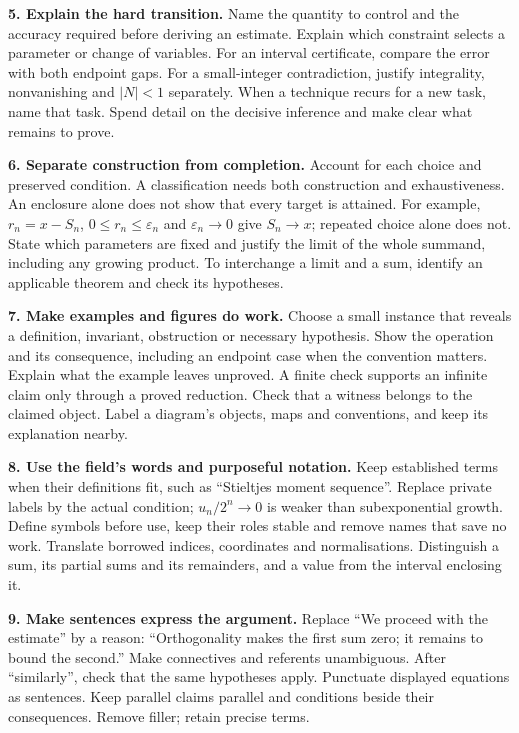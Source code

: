 \documentclass[10pt]{article}
\newcommand{\instruction}[2]{\par\medskip\noindent\textbf{#1.} #2\par}
\begin{document}
\instruction{5. Explain the hard transition}{
Name the quantity to control and the accuracy required before deriving an estimate.
Explain which constraint selects a parameter or change of variables. For an
interval certificate, compare the error with both endpoint gaps. For a
small-integer contradiction, justify integrality, nonvanishing and $|N|<1$
separately. When a technique recurs for a new task, name that task. Spend detail
on the decisive inference and make clear what remains to prove.}

\instruction{6. Separate construction from completion}{
Account for each choice and preserved condition. A classification needs both
construction and exhaustiveness. An enclosure alone does not show that every
target is attained. For example, $r_n=x-S_n$, $0\le r_n\le\varepsilon_n$
and $\varepsilon_n\to0$ give $S_n\to x$; repeated choice alone does not.
State which parameters are fixed and justify the limit of the whole summand,
including any growing product. To interchange a limit and a sum, identify an
applicable theorem and check its hypotheses.}

\newpage\enlargethispage{3\baselineskip}
\instruction{7. Make examples and figures do work}{
Choose a small instance that reveals a definition, invariant, obstruction or
necessary hypothesis. Show the operation and its consequence, including an
endpoint case when the convention matters. Explain what the example leaves
unproved. A finite check supports an infinite claim only through a proved
reduction. Check that a witness belongs to the claimed object. Label a diagram's
objects, maps and conventions, and keep its explanation nearby.}

\instruction{8. Use the field's words and purposeful notation}{
Keep established terms when their definitions fit, such as ``Stieltjes moment
sequence''. Replace private labels by the actual condition; $u_n/2^n\to0$
is weaker than subexponential growth. Define symbols before use, keep their
roles stable and remove names that save no work. Translate borrowed indices,
coordinates and normalisations. Distinguish a sum, its partial sums and its
remainders, and a value from the interval enclosing it.}

\instruction{9. Make sentences express the argument}{
Replace ``We proceed with the estimate'' by a reason: ``Orthogonality makes the
first sum zero; it remains to bound the second.'' Make connectives and referents
unambiguous. After ``similarly'', check that the same hypotheses apply.
Punctuate displayed equations as sentences. Keep parallel claims parallel
and conditions beside their consequences. Remove filler; retain precise terms.}
\end{document}
